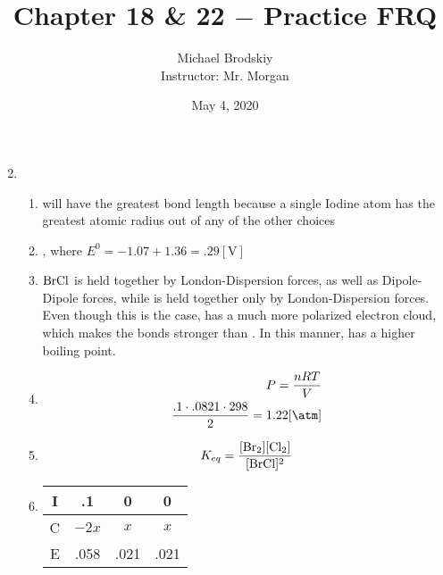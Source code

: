 \documentclass[12pt]{article}
\title{Chapter 18 \& 22 $-$ Practice FRQ}
\date{May 4, 2020}
\author{Michael Brodskiy\\ \small Instructor: Mr. Morgan}
\begin{document}
\maketitle

\begin{enumerate}

    \setcounter{enumi}{1}

  \item

    \begin{enumerate}

      \item {} will have the greatest bond length because a single Iodine atom has the greatest atomic radius out of any of the other choices

      \item {}, where $E^0=-1.07+1.36=.29[\si{\volt}]$

      \item $\ce{BrCl}$ is held together by London-Dispersion forces, as well as Dipole-Dipole forces, while  is held together only by London-Dispersion forces. Even though this is the case,  has a much more polarized electron cloud, which makes the bonds stronger than . In this manner,  has a higher boiling point.

      \item 

        \begin{equation}
          \begin{split}
            P=\frac{nRT}{V}\\
            \frac{.1\cdot.0821\cdot 298}{2}=1.22[\si{\atm}]
          \end{split}
          \label{1}
        \end{equation}

      \item 

        \begin{equation}
          \begin{split}
            K_{eq}=\frac{[\ce{Br2}][\ce{Cl2}]}{[\ce{BrCl}]^2}
          \end{split}
          \label{2}
        \end{equation}

      \item \begin{tabular}{|c|c|c|c|} \hline I & .1 & 0 & 0\\\hline C & $-2x$ & $x$ & $x$ \\ \hline E & .058 & .021 & .021\\\hline\end{tabular}


\end{enumerate}
\end{enumerate}
\end{document}
